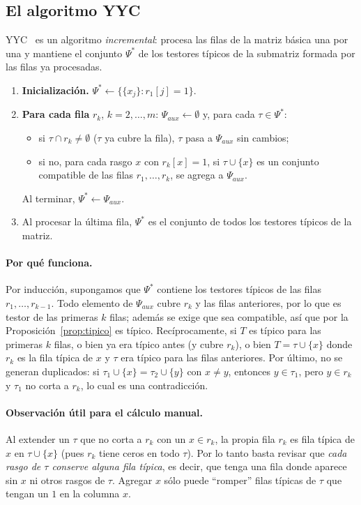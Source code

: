 \documentclass[11pt, a4paper]{article}
\theoremstyle{definition}
\theoremstyle{plain}
\newcommand{\Psis}{\Psi^{*}}
\newcommand{\x}[1]{x_{#1}}
\begin{document}
\subsection{El algoritmo YYC}

YYC~\cite{yyc2014} es un algoritmo \emph{incremental}: procesa las filas de la
matriz básica una por una y mantiene el conjunto $\Psis$ de los testores
típicos de la submatriz formada por las filas ya procesadas.

\begin{enumerate}[nosep]
\item \textbf{Inicialización.} $\Psis\leftarrow\{\{\x j\}: r_1[j]=1\}$.
\item \textbf{Para cada fila} $r_k$, $k=2,\dots,m$: $\Psi_{aux}\leftarrow\emptyset$ y,
  para cada $\tau\in\Psis$:
  \begin{itemize}[nosep]
  \item si $\tau\cap r_k\neq\emptyset$ ($\tau$ ya cubre la fila), $\tau$ pasa a
    $\Psi_{aux}$ sin cambios;
  \item si no, para cada rasgo $x$ con $r_k[x]=1$, si $\tau\cup\{x\}$ es un
    conjunto compatible de las filas $r_1,\dots,r_k$, se agrega a $\Psi_{aux}$.
  \end{itemize}
  Al terminar, $\Psis\leftarrow\Psi_{aux}$.
\item Al procesar la última fila, $\Psis$ es el conjunto de todos los testores
  típicos de la matriz.
\end{enumerate}

\paragraph{Por qué funciona.} Por inducción, supongamos que $\Psis$ contiene los
testores típicos de las filas $r_1,\dots,r_{k-1}$. Todo elemento de $\Psi_{aux}$
cubre $r_k$ y las filas anteriores, por lo que es testor de las primeras $k$
filas; además se exige que sea compatible, así que por la
Proposición~\ref{prop:tipico} es típico. Recíprocamente, si $T$ es típico para
las primeras $k$ filas, o bien ya era típico antes (y cubre $r_k$), o bien
$T=\tau\cup\{x\}$ donde $r_k$ es la fila típica de $x$ y $\tau$ era típico para
las filas anteriores. Por último, no se generan duplicados: si
$\tau_1\cup\{x\}=\tau_2\cup\{y\}$ con $x\neq y$, entonces $y\in\tau_1$, pero $y\in r_k$
y $\tau_1$ no corta a $r_k$, lo cual es una contradicción.

\paragraph{Observación útil para el cálculo manual.} Al extender un $\tau$ que no
corta a $r_k$ con un $x\in r_k$, la propia fila $r_k$ es fila típica de $x$ en
$\tau\cup\{x\}$ (pues $r_k$ tiene ceros en todo $\tau$). Por lo tanto basta revisar
que \emph{cada rasgo de $\tau$ conserve alguna fila típica}, es decir, que tenga una
fila donde aparece sin $x$ ni otros rasgos de $\tau$. Agregar $x$ sólo puede
``romper'' filas típicas de $\tau$ que tengan un $1$ en la columna $x$.
\end{document}
